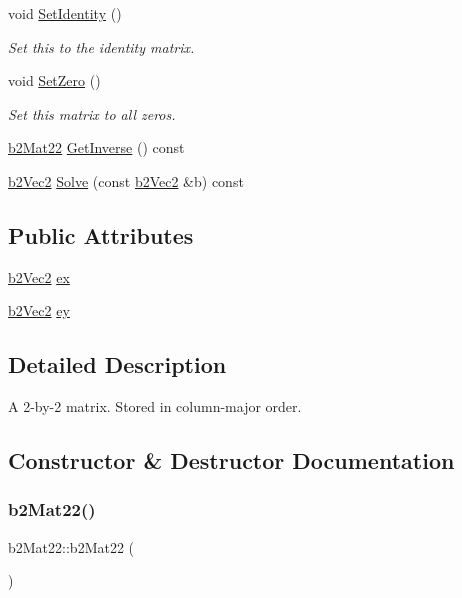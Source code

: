 \begin{DoxyCompactItemize}
void \mbox{\hyperlink{structb2_mat22_a7192f063b771ac9ded060e41df890509}{Set\+Identity}} ()
\begin{DoxyCompactList}\small\item\em Set this to the identity matrix. \end{DoxyCompactList}\item 
void \mbox{\hyperlink{structb2_mat22_aaeae95f61cf3171ffb94703980e3594b}{Set\+Zero}} ()
\begin{DoxyCompactList}\small\item\em Set this matrix to all zeros. \end{DoxyCompactList}\item 
\mbox{\hyperlink{structb2_mat22}{b2\+Mat22}} \mbox{\hyperlink{structb2_mat22_ad0b0676deea081b761c67be48e0ac850}{Get\+Inverse}} () const
\item 
\mbox{\hyperlink{structb2_vec2}{b2\+Vec2}} \mbox{\hyperlink{structb2_mat22_a3313c8d135c01fbf74e7fea31f1ea4c1}{Solve}} (const \mbox{\hyperlink{structb2_vec2}{b2\+Vec2}} \&b) const
\end{DoxyCompactItemize}
\subsection*{Public Attributes}
\begin{DoxyCompactItemize}
\item 
\mbox{\hyperlink{structb2_vec2}{b2\+Vec2}} \mbox{\hyperlink{structb2_mat22_abaffa5fc1d401ea36415acffa6205689}{ex}}
\item 
\mbox{\hyperlink{structb2_vec2}{b2\+Vec2}} \mbox{\hyperlink{structb2_mat22_af19db58941d2cd146325ef3191b776fd}{ey}}
\end{DoxyCompactItemize}


\subsection{Detailed Description}
A 2-\/by-\/2 matrix. Stored in column-\/major order. 

\subsection{Constructor \& Destructor Documentation}
\mbox{\label{structb2_mat22_ac3e10f6d457c8dab9062ba378f66bc4d}} 
\subsubsection{\texorpdfstring{b2Mat22()}{b2Mat22()}\hspace{0.1cm}{\footnotesize\ttfamily [1/3]}}
{\footnotesize\ttfamily b2\+Mat22\+::b2\+Mat22 (\begin{DoxyParamCaption}{ }\end{DoxyParamCaption})\hspace{0.3cm}{\ttfamily [inline]}}



